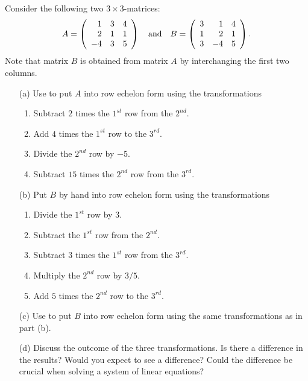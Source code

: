 \begin{exercise}
Consider the following two $3\times 3$-matrices:
\begin{equation*}
A=\left( \begin{array}{rrr}
     1  &  3  &  4\\
     2  &  1  &  1\\
    -4  &  3  &  5
\end{array}\right) \quad\mbox{and}\quad
B=\left( \begin{array}{rrr}
     3  &  1  &  4\\
     1  &  2  &  1\\
     3  & -4  &  5
\end{array}\right).
\end{equation*}
Note that matrix $B$ is obtained from matrix $A$ by interchanging the
first two columns.
\begin{itemize}
\item[(a)] Use \Matlab to put $A$ into row echelon form using the
transformations
\begin{enumerate}
\item Subtract $2$ times the $1^{st}$ row from the $2^{nd}$.
\item Add $4$ times the $1^{st}$ row to the $3^{rd}$.
\item Divide the $2^{nd}$ row by $-5$.
\item Subtract $15$ times the $2^{nd}$ row from the $3^{rd}$.
\end{enumerate}
\item[(b)] Put $B$ by hand into row echelon form using the
transformations
\begin{enumerate}
\item Divide the $1^{st}$ row by $3$.
\item Subtract the $1^{st}$ row from the $2^{nd}$.
\item Subtract $3$ times the $1^{st}$ row from the $3^{rd}$.
\item Multiply the $2^{nd}$ row by $3/5$.
\item Add $5$ times the $2^{nd}$ row to the $3^{rd}$.
\end{enumerate}
\item[(c)] Use \Matlab to put $B$ into row echelon form using the
same transformations as in part (b).
\item[(d)] Discuss the outcome of the three transformations.  Is
there a difference in the results?  Would you expect to see a
difference?  Could the difference be crucial when solving a system
of linear equations?
\end{itemize}
\end{exercise}

